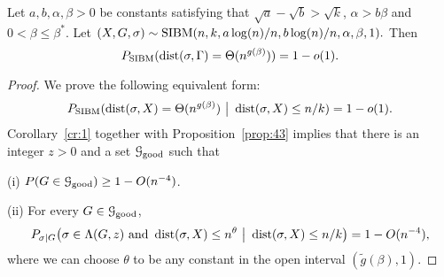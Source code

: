 \documentclass{article}
\begin{document}
\begin{theorem}  \label{thm:dist}
	Let $a,b,\alpha,\beta> 0$ be constants satisfying that $\sqrt{a}-\sqrt{b} > \sqrt{k}$, $\alpha>b\beta$ and $0<\beta\le \beta^\ast$. Let 
	$
	(X,G,\sigma) \sim \operatorname{SIBM}(n,k, a\log(n)/n, b\log(n)/n,\alpha,\beta, 1) .
	$
	Then
	$$
	P_{\operatorname{SIBM}}(\operatorname{dist}(\sigma, \Gamma) = \Theta(n^{g(\beta)}) ) = 1-o(1) .
	$$
\end{theorem}
\begin{proof}
	We prove the following equivalent form:
	$$
	P_{\operatorname{SIBM}}(\operatorname{dist}(\sigma, X) = \Theta(n^{g(\beta)}) ~\big|~ \operatorname{dist}(\sigma, X) \le n/k) = 1-o(1) .
	$$
	Corollary~\ref{cr:1} together with Proposition~\ref{prop:43} implies that there is an integer $z>0$ and a set $\mathcal{G}_{\operatorname{good}}$ such that
	
	\noindent (i)
	$P(G\in\mathcal{G}_{\operatorname{good}}) \ge 1- O(n^{-4})$.
	
	\noindent (ii) For every $G\in\mathcal{G}_{\operatorname{good}}$, 
	\begin{equation}  \label{eq:hs}
	P_{\sigma|G} \big( \sigma \in  \Lambda(G, z)
	\text{~and~} \operatorname{dist}(\sigma, X) \le n^\theta ~\big|~ \operatorname{dist}(\sigma, X) \le n/k \big) 
	=1- O(n^{-4}) ,
	\end{equation}
	where we can choose $\theta$ to be any constant in the open interval $(\tilde{g}(\beta), 1)$.
	

\end{proof}
\end{document}
